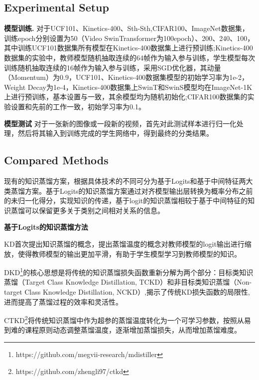 \documentclass[10.5pt,letterpaper]{article}
\begin{document}
	\subsection{Experimental Setup}

\textbf{模型训练.}
对于UCF101\cite{soomro-arxiv2012-ucf101}、Kinetics-400\cite{kay-arXiv2017-kinetics}、Sth-Sth\cite{goyal-iccv2017-sthsth},CIFAR100\cite{wah-2011-cifar}、ImageNet\cite{krizhevsky-nips2012-imagenet}数据集，训练epoch分别设置为50（Video SwinTransformer为100epoch）、200、240、100，其中训练UCF101数据集所有模型在Kinetics-400数据集上进行预训练;Kinetics-400数据集的实验中，教师模型随机抽取连续的64帧作为输入参与训练，学生模型每次训练随机抽取连续的16帧作为输入参与训练，采用SGD优化器，其动量（Momentum）为0.9，UCF101、Kinetics-400数据集模型的初始学习率为1e-2，Weight Decay为1e-4，Kinetics-400\cite{kay-arXiv2017-kinetics}数据集上SwinT和SwinS模型均在ImageNet-1K上进行预训练，基本设置与\cite{liu-cvpr2022-video}一致，其余模型均为随机初始化;CIFAR100数据集的实验设置和先前的工作\cite{pham-wacv2024-frequency}一致，初始学习率为0.1。


\textbf{模型测试}
对于一张新的图像或一段新的视频，首先对此测试样本进行归一化处理，然后将其输入到训练完成的学生网络中，得到最终的分类结果。

\subsection{Compared Methods}
现有的知识蒸馏方案，根据具体技术的不同可分为基于Logits和基于中间特征两大类蒸馏方案。基于Logits的知识蒸馏方案通过对齐模型输出层转换为概率分布之前的未归一化得分，实现知识的传递，基于logit的知识蒸馏相较于基于中间特征的知识蒸馏可以保留更多关于类别之间相对关系的信息。

\textbf{基于Logits的知识蒸馏方法}

KD\cite{geoffrey-arxiv2015-kd}首次提出知识蒸馏的概念，提出蒸馏温度的概念对教师模型的logit输出进行缩放，使得教师模型的输出更加平滑，有助于学生模型学习到教师模型的知识。

DKD\cite{zhao-cvpr2022-dkd}\footnote{https://github.com/megvii-research/mdistiller
}的核心思想是将传统的知识蒸馏损失函数重新分解为两个部分：目标类知识蒸馏（Target Class Knowledge Distillation, TCKD）和非目标类知识蒸馏（Non-target Class Knowledge Distillation, NCKD）,揭示了传统KD损失函数的局限性,进而提高了蒸馏过程的效率和灵活性。

CTKD\cite{li-aaai2023-ctkd}\footnote{https://github.com/zhengli97/ctkd}将传统知识蒸馏中作为超参的蒸馏温度转化为一个可学习参数，按照从易到难的课程原则动态调整蒸馏温度，逐渐增加蒸馏损失，从而增加蒸馏难度。
\end{document}
